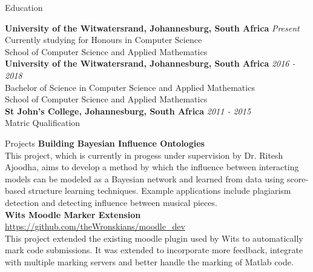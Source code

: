\documentclass{resume} %
\begin{document}

\begin{rSection}{Education}

{\bf University of the Witwatersrand, Johannesburg, South Africa} \hfill {\em Present} 
\\ Currently studying for Honours in Computer Science
\\ School of Computer Science and Applied Mathematics\\
{\bf University of the Witwatersrand, Johannesburg, South Africa} \hfill {\em 2016 - 2018} 
\\ Bachelor of Science in Computer Science and Applied Mathematics
\\ School of Computer Science and Applied Mathematics\\
{\bf St John's College, Johannesburg, South Africa} \hfill {\em 2011 - 2015} 
\\ Matric Qualification


\end{rSection}

\begin{rSection}{Projects}
{\bf Building Bayesian Influence Ontologies}
\\This project, which is currently in progess under supervision by Dr. Ritesh Ajoodha, aims to develop a method by which the influence between interacting models can be modeled as a Bayesian network and learned from data using score-based structure learning techniques. Example applications include plagiarism detection and detecting influence between musical pieces.\\
{\bf Wits Moodle Marker Extension}
\\ \url{https://github.com/theWronskians/moodle_dev}
\\This project extended the existing moodle plugin used by Wits to automatically mark code submissions. It was extended to incorporate more feedback, integrate with multiple marking servers and better handle the marking of Matlab code.\\

\end{rSection}
\end{document}
